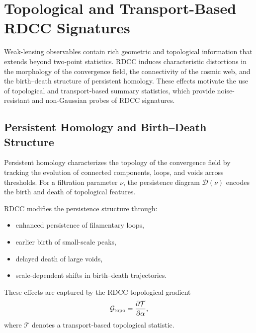 \documentclass[11pt,a4paper]{article}
\begin{document}

\section{Topological and Transport-Based RDCC Signatures}

Weak-lensing observables contain rich geometric and topological information that
extends beyond two-point statistics. RDCC induces characteristic distortions in
the morphology of the convergence field, the connectivity of the cosmic web, and
the birth--death structure of persistent homology. These effects motivate the use
of topological and transport-based summary statistics, which provide
noise-resistant and non-Gaussian probes of RDCC signatures.

\subsection{Persistent Homology and Birth--Death Structure}

Persistent homology characterizes the topology of the convergence field by
tracking the evolution of connected components, loops, and voids across
thresholds. For a filtration parameter $\nu$, the persistence diagram
$\mathcal{D}(\nu)$ encodes the birth and death of topological features.

RDCC modifies the persistence structure through:

\begin{itemize}
    \item enhanced persistence of filamentary loops,
    \item earlier birth of small-scale peaks,
    \item delayed death of large voids,
    \item scale-dependent shifts in birth--death trajectories.
\end{itemize}

These effects are captured by the RDCC topological gradient
\begin{equation}
    \mathcal{G}_{\mathrm{topo}}
    =
    \pdv{\mathcal{T}}{\alpha},
\end{equation}
where $\mathcal{T}$ denotes a transport-based topological statistic.

\end{document}
